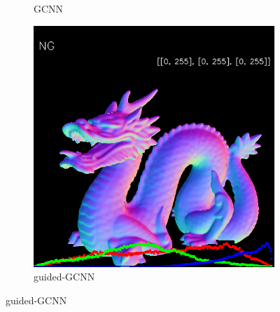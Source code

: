 \begin{figure}[h!]
\begin{subfigure}[b]{0.24\linewidth}
		\caption{GCNN}
	\end{subfigure}
	\begin{subfigure}[b]{0.24\linewidth}
		\includegraphics[width=\linewidth]{./Figures/comparison/fancy_eval_3_normal_NG.png}
		\caption{guided-GCNN}
	\end{subfigure}
	

\end{figure}
